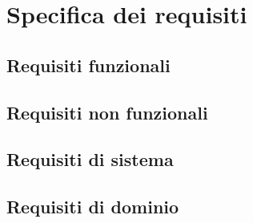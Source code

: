 \chapter{Specifica dei requisiti}
\section{Requisiti funzionali}

\section{Requisiti non funzionali}
\section{Requisiti di sistema}
\section{Requisiti di dominio}